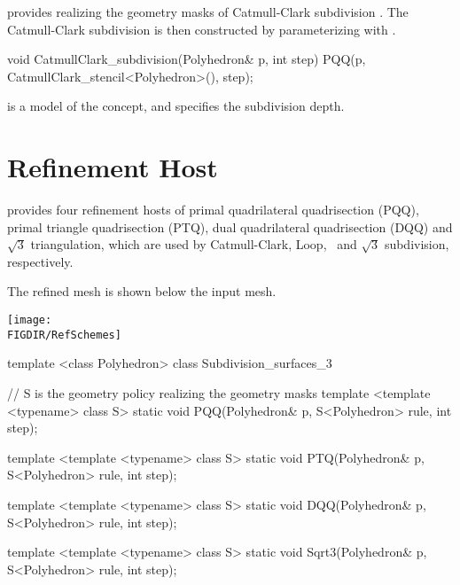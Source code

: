  provides  
realizing the geometry masks of Catmull-Clark subdivision 
\cite{cgal:cc-rgbss-78}. 
The Catmull-Clark subdivision is then constructed by parameterizing 
 with 
.

\begin{ccExampleCode}
  void CatmullClark_subdivision(Polyhedron& p, int step) {
    PQQ(p, CatmullClark_stencil<Polyhedron>(), step);
  }
\end{ccExampleCode}

 is a model of the 
concept, and  specifies the subdivision depth.


\section{Refinement Host}
 provides four refinement hosts of primal 
quadrilateral quadrisection (PQQ), primal triangle 
quadrisection (PTQ), dual quadrilateral 
quadrisection (DQQ) and $\sqrt{3}$ triangulation, which 
are used by Catmull-Clark, Loop, \DS\ and $\sqrt{3}$ subdivision, 
respectively. 

The refined mesh is shown below the input mesh.
\begin{ccTexOnly}
  \begin{center}
    \parbox{0.6\textwidth}{%
      \texttt{[image: \\FIGDIR/RefSchemes]}%
    }
  \end{center}
\end{ccTexOnly}



\begin{ccExampleCode}
template <class Polyhedron>
class Subdivision_surfaces_3 {
  // S is the geometry policy realizing the geometry masks
  template <template <typename> class S>
  static void PQQ(Polyhedron& p, S<Polyhedron> rule, int step);

  template <template <typename> class S>
  static void PTQ(Polyhedron& p, S<Polyhedron> rule, int step);

  template <template <typename> class S>
  static void DQQ(Polyhedron& p, S<Polyhedron> rule, int step);

  template <template <typename> class S>
  static void Sqrt3(Polyhedron& p, S<Polyhedron> rule, int step);
}
\end{ccExampleCode}

